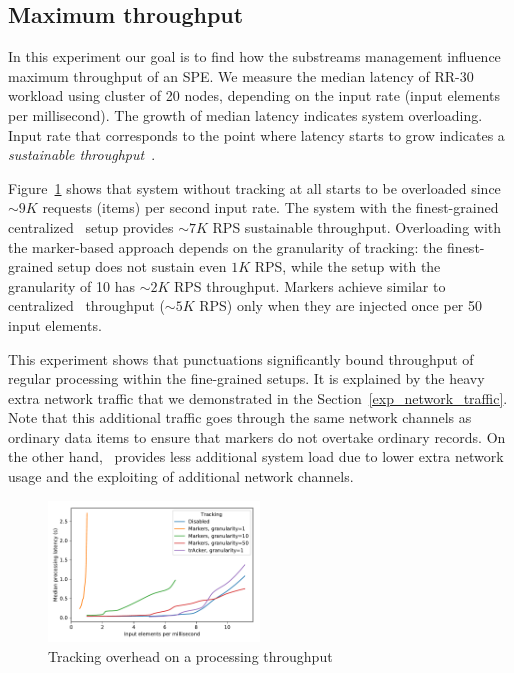 \subsection{Maximum throughput}
In this experiment our goal is to find how the substreams management influence maximum throughput of an SPE. We measure the median latency of RR-30 workload using cluster of 20 nodes, depending on the input rate (input elements per millisecond). The growth of median latency indicates system overloading. Input rate that corresponds to the point where latency starts to grow indicates a {\em sustainable throughput}~\cite{karimov2018benchmarking}.

Figure~\ref{throughput_overhead} shows that system without tracking at all starts to be overloaded since $\sim 9K$ requests (items) per second input rate. The system with the finest-grained centralized \tracker\ setup provides $\sim 7K$ RPS sustainable throughput. Overloading with the marker-based approach depends on the granularity of tracking: the finest-grained setup does not sustain even $1K$ RPS, while the setup with the granularity of 10 has $\sim 2K$ RPS throughput. Markers achieve similar to centralized \tracker\ throughput ($\sim 5K$ RPS) only when they are injected once per 50 input elements.

This experiment shows that punctuations significantly bound throughput of regular processing within the fine-grained setups. It is explained by the heavy extra network traffic that we demonstrated in the Section~\ref{exp_network_traffic}. Note that this additional traffic goes through the same network channels as ordinary data items to ensure that markers do not overtake ordinary records. On the other hand, \tracker\ provides less additional system load due to lower extra network usage and the exploiting of additional network channels.

\begin{figure}[htbp]
  \centering
  \includegraphics[width=0.50\textwidth]{pics/throughput_overhead_50.pdf}
  \caption{Tracking overhead on a processing throughput}
  \label{throughput_overhead}
\end{figure}

